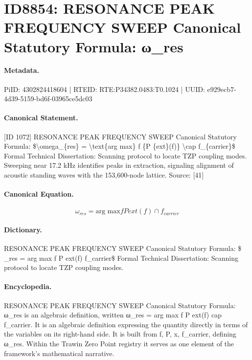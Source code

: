 \section*{ID8854: RESONANCE PEAK FREQUENCY SWEEP Canonical Statutory Formula: ω\_res}
\paragraph{Metadata.}
PiID: 4302824418604 | RTEID: RTE:P34382.0483:T0.1024 | UUID: e929ecb7-4d39-5159-bd6f-03965ce5dc03

\paragraph{Canonical Statement.}
[ID 1072] RESONANCE PEAK FREQUENCY SWEEP Canonical Statutory Formula: \$\textbackslash{}omega\_\{res\} = \textbackslash{}text\{arg max\} f \{P \{ext\}(f)\} \textbackslash{}cap f\_\{carrier\}\$ Formal Technical Dissertation: Scanning protocol to locate TZP coupling modes. Sweeping near 17.2 kHz identifies peaks in extraction, signaling alignment of acoustic standing waves with the 153,600-node lattice. Source: [41]

\paragraph{Canonical Equation.}
\[
\omega_{res} = \text{arg max} f {P {ext}(f)} \cap f_{carrier}
\]

\paragraph{Dictionary.}
RESONANCE PEAK FREQUENCY SWEEP Canonical Statutory Formula: \$ \_res = arg max f P ext(f) f\_carrier\$ Formal Technical Dissertation: Scanning protocol to locate TZP coupling modes.

\paragraph{Encyclopedia.}
RESONANCE PEAK FREQUENCY SWEEP Canonical Statutory Formula: ω\_res is an algebraic definition, written ω\_res = arg max f P ext(f) cap f\_carrier. It is an algebraic definition expressing the quantity directly in terms of the variables on its right-hand side. It is built from f, P, x, f\_carrier, defining ω\_res. Within the Trawin Zero Point registry it serves as one element of the framework's mathematical narrative.
